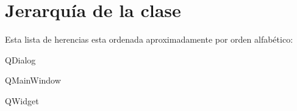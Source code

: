 \section{Jerarquía de la clase}
Esta lista de herencias esta ordenada aproximadamente por orden alfabético\-:\begin{DoxyCompactList}
\item {}
\item Q\-Dialog\begin{DoxyCompactList}
\item {}
\item {}
\end{DoxyCompactList}
\item Q\-Main\-Window\begin{DoxyCompactList}
\item {}
\end{DoxyCompactList}
\item Q\-Widget\begin{DoxyCompactList}
\item {}
\end{DoxyCompactList}
\end{DoxyCompactList}
